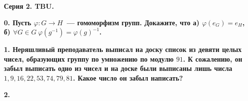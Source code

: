 \documentclass[12pt]{article}
\begin{document}
\centerline{\bf{Серия 2. TBU. }}

	\bf{0.} Пусть $\varphi\colon G \to H$~--- гомоморфизм групп. Докажите, что а) $\varphi(e_{G}) = e_{H}$, б) $\forall G \in G \ \varphi(g^{-1}) = \varphi(g)^{-1}$.

	\bf{1.} Неряшливый преподаватель выписал на доску список из девяти целых чисел, образующих группу по умножению по модулю $91$. К сожалению, он забыл выписать одно из чисел и на доске были выписаны лишь числа $1, 9, 16, 22, 53, 74, 79, 81$. Какое число он забыл написать? 

	 \bf{2.} 
\end{document}
